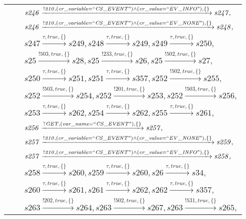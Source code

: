 \begin{tabular}{lcp{350px}}
& & $\mathit{s246}\xrightarrow{\mathit{!210}, \mathit{(cr\_variable = ``CS\_EVENT") \land (cr\_value = ``EV\_INFO")}, \{\}}\mathit{s247},$ \\
& & $\mathit{s246}\xrightarrow{\mathit{!210}, \mathit{(cr\_variable = ``CS\_EVENT") \land (cr\_value = ``EV\_NONE")}, \{\}}\mathit{s248},$ \\
& & $\mathit{s247}\xrightarrow{\mathit{\tau}, \mathit{true}, \{\}}\mathit{s249},\mathit{s248}\xrightarrow{\mathit{\tau}, \mathit{true}, \{\}}\mathit{s249},\mathit{s249}\xrightarrow{\mathit{\tau}, \mathit{true}, \{\}}\mathit{s250},$ \\
& & $\mathit{s25}\xrightarrow{\mathit{!503}, \mathit{true}, \{\}}\mathit{s28},\mathit{s25}\xrightarrow{\mathit{!233}, \mathit{true}, \{\}}\mathit{s26},\mathit{s25}\xrightarrow{\mathit{!502}, \mathit{true}, \{\}}\mathit{s27},$ \\
& & $\mathit{s250}\xrightarrow{\mathit{\tau}, \mathit{true}, \{\}}\mathit{s251},\mathit{s251}\xrightarrow{\mathit{\tau}, \mathit{true}, \{\}}\mathit{s357},\mathit{s252}\xrightarrow{\mathit{!502}, \mathit{true}, \{\}}\mathit{s255},$ \\
& & $\mathit{s252}\xrightarrow{\mathit{!503}, \mathit{true}, \{\}}\mathit{s254},\mathit{s252}\xrightarrow{\mathit{!201}, \mathit{true}, \{\}}\mathit{s253},\mathit{s252}\xrightarrow{\mathit{!503}, \mathit{true}, \{\}}\mathit{s256},$ \\
& & $\mathit{s253}\xrightarrow{\mathit{\tau}, \mathit{true}, \{\}}\mathit{s262},\mathit{s254}\xrightarrow{\mathit{\tau}, \mathit{true}, \{\}}\mathit{s262},\mathit{s255}\xrightarrow{\mathit{\tau}, \mathit{true}, \{\}}\mathit{s261},$ \\
& & $\mathit{s256}\xrightarrow{\mathit{?GET}, \mathit{(var\_name = ``CS\_EVENT")}, \{\}}\mathit{s257},$ \\
& & $\mathit{s257}\xrightarrow{\mathit{!210}, \mathit{(cr\_variable = ``CS\_EVENT") \land (cr\_value = ``EV\_NONE")}, \{\}}\mathit{s259},$ \\
& & $\mathit{s257}\xrightarrow{\mathit{!210}, \mathit{(cr\_variable = ``CS\_EVENT") \land (cr\_value = ``EV\_INFO")}, \{\}}\mathit{s258},$ \\
& & $\mathit{s258}\xrightarrow{\mathit{\tau}, \mathit{true}, \{\}}\mathit{s260},\mathit{s259}\xrightarrow{\mathit{\tau}, \mathit{true}, \{\}}\mathit{s260},\mathit{s26}\xrightarrow{\mathit{\tau}, \mathit{true}, \{\}}\mathit{s34},$ \\
& & $\mathit{s260}\xrightarrow{\mathit{\tau}, \mathit{true}, \{\}}\mathit{s261},\mathit{s261}\xrightarrow{\mathit{\tau}, \mathit{true}, \{\}}\mathit{s262},\mathit{s262}\xrightarrow{\mathit{\tau}, \mathit{true}, \{\}}\mathit{s357},$ \\
& & $\mathit{s263}\xrightarrow{\mathit{!202}, \mathit{true}, \{\}}\mathit{s264},\mathit{s263}\xrightarrow{\mathit{!502}, \mathit{true}, \{\}}\mathit{s267},\mathit{s263}\xrightarrow{\mathit{!531}, \mathit{true}, \{\}}\mathit{s265},$ \\
\end{tabular}

